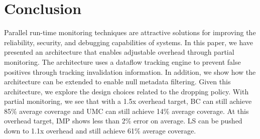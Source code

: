\section{Conclusion}
\label{sec:conclusion}

Parallel run-time monitoring techniques are attractive solutions for improving
the reliability, security, and debugging capabilities of systems. In this
paper, we have presented an architecture that enables adjustable overhead through partial monitoring. 
The architecture uses a dataflow tracking engine to prevent false positives
through tracking invalidation information. In addition, we show how the
architecture can be extended to enable null metadata filtering.
Given this architecture, we explore the design choices related to the dropping policy.
With partial monitoring, we see that with a 1.5x overhead target, BC can still
achieve 85\% average coverage and UMC can still achieve 14\% 
average coverage.
At this overhead target, IMP shows less than 2\% error on average.
LS can be pushed down to 1.1x overhead and still achieve 61\% average coverage.


